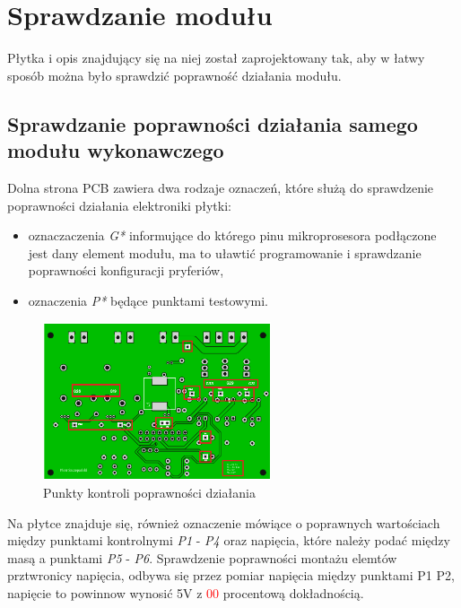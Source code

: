 \documentclass[12pt, eng, twoside, openany, final]{mgr}
\begin{document}
    \newpage
    \section{Sprawdzanie modułu}
            Płytka i opis znajdujący się na niej został zaprojektowany tak, aby w łatwy sposób można było sprawdzić poprawność działania modułu. 
            
            \subsection{Sprawdzanie poprawności działania samego modułu wykonawczego}
            Dolna strona PCB zawiera dwa rodzaje oznaczeń, które służą do sprawdzenie poprawności działania elektroniki płytki:
            \begin{itemize}
                \item oznaczaczenia \emph{G*} informujące do którego pinu mikroprosesora podłączone jest dany element modułu, ma to uławtić programowanie i sprawdzanie poprawności konfiguracji pryferiów,
                \item oznaczenia \emph{P*} będące punktami testowymi.
            \end{itemize}
               \begin{figure}[H]
                \begin{center}
                    \includegraphics[width=0.6\textwidth]{pcb_dol_zaz.png}
                    \caption{Punkty kontroli poprawności działania}
                \end{center}
                \end{figure}
            Na płytce znajduje się, również oznaczenie mówiące o poprawnych wartościach między punktami kontrolnymi \emph{P1} - \emph{P4} oraz napięcia, które należy podać między masą a punktami \emph{P5} - \emph{P6}.
            Sprawdzenie poprawności montażu elemtów prztwronicy napięcia, odbywa się przez pomiar napięcia między punktami P1 P2, napięcie to powinnow wynosić 5V z  \textcolor{red}{00} procentową dokładnością.
\end{document}
